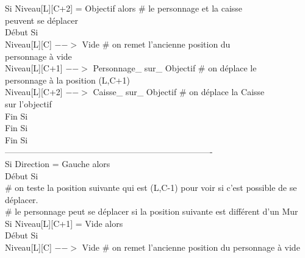 \documentclass{article}
\begin{document}
\begin{tabbing}
\\
\\	\hspace{4cm}		Si Niveau[L][C+2] = Objectif alors         		\# le personnage et la caisse 
\\ \hspace{4cm} peuvent se déplacer
\\	\hspace{4cm}		Début Si
\\	\hspace{5cm}			Niveau[L][C] $-->$ Vide 				\# on remet l'ancienne position du 
\\ \hspace{5cm} personnage à vide
\\	\hspace{5cm}			Niveau[L][C+1] $-->$ Personnage\_ sur\_ Objectif \# on déplace le 
\\ \hspace{5cm} personnage à la position (L,C+1)
\\	\hspace{5cm}			Niveau[L][C+2] $-->$ Caisse\_ sur\_ Objectif		\# on déplace la Caisse 
\\ \hspace{5cm} sur l'objectif
\\	\hspace{4cm}		Fin Si
\\	\hspace{3cm}	Fin Si 
\\	\hspace{2cm} Fin Si 
\\   			-------------------------------------------------------------------------
\\	\hspace{2cm} Si Direction = Gauche  alors   
\\	\hspace{2cm} Début Si
\\	\hspace{3cm}	\# on teste la position suivante qui est (L,C-1)	pour voir si c'est possible de se déplacer.
\\	\hspace{3cm}	\# le personnage peut se déplacer si la position suivante est différent d'un Mur		\\	\hspace{3cm}	Si Niveau[L][C+1] = Vide alors			
\\	\hspace{3cm}	Début Si
\\	\hspace{4cm}		Niveau[L][C] $-->$ Vide 		\# on remet l'ancienne position du personnage à vide

\end{tabbing}
\end{document}
